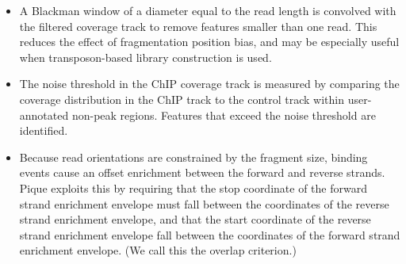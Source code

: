 \begin{refsection}
\begin{itemize}

\item A Blackman window of a diameter equal to the read length is
  convolved with the filtered coverage track to remove features
  smaller than one read. This reduces the effect of fragmentation
  position bias, and may be especially useful when transposon-based
  library construction is used.

\item The noise threshold in the ChIP coverage track is measured by
  comparing the coverage distribution in the ChIP track to the control
  track within user-annotated non-peak regions. Features that exceed
  the noise threshold are identified.

\item Because read orientations are constrained by the fragment size,
  binding events cause an offset enrichment between the forward and
  reverse strands. Pique exploits this by requiring that the stop
  coordinate of the forward strand enrichment envelope must fall
  between the coordinates of the reverse strand enrichment envelope,
  and that the start coordinate of the reverse strand enrichment
  envelope fall between the coordinates of the forward strand
  enrichment envelope. (We call this the overlap criterion.)

\end{itemize}


\end{refsection}
